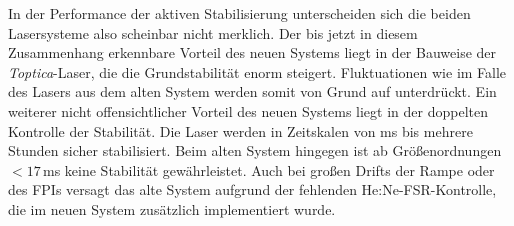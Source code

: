 In der Performance der aktiven Stabilisierung unterscheiden sich die beiden
Lasersysteme also scheinbar nicht merklich. Der bis jetzt in diesem
Zusammenhang erkennbare Vorteil des neuen Systems liegt in der Bauweise der \textit{Toptica}-Laser, die die Grundstabilität enorm steigert. Fluktuationen wie im Falle des Lasers aus dem
alten System werden somit von Grund auf unterdrückt. Ein weiterer nicht
offensichtlicher Vorteil des neuen Systems liegt in der doppelten Kontrolle der
Stabilität. Die Laser werden in Zeitskalen von ms bis mehrere
Stunden sicher stabilisiert. Beim alten System hingegen ist ab Größenordnungen
$<17\,$ms keine Stabilität gewährleistet. Auch bei großen Drifts der Rampe oder
des FPIs versagt das alte System aufgrund der fehlenden He:Ne-FSR-Kontrolle, die
im neuen System zusätzlich implementiert wurde.


